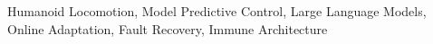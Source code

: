 \documentclass[conference]{IEEEtran}
\begin{document}
\begin{IEEEkeywords}
Humanoid Locomotion, Model Predictive Control, Large Language Models, Online Adaptation, Fault Recovery, Immune Architecture
\end{IEEEkeywords}











\end{document}
